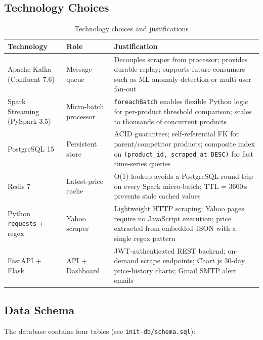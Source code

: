 \documentclass[11pt,a4paper]{article}
\begin{document}
\subsection{Technology Choices}

\begin{table}[H]
\centering\small\renewcommand{\arraystretch}{1.25}
\begin{tabularx}{\textwidth}{L{2.8cm} L{2.8cm} X}
\toprule
\textbf{Technology} & \textbf{Role} & \textbf{Justification} \\
\midrule
Apache Kafka (Confluent 7.6) & Message queue
  & Decouples scraper from processor; provides durable replay; supports
    future consumers such as ML anomaly detection or multi-user fan-out \\
Spark Streaming (PySpark 3.5) & Micro-batch processor
  & \texttt{foreachBatch} enables flexible Python logic for per-product
    threshold comparison; scales to thousands of concurrent products \\
PostgreSQL 15 & Persistent store
  & ACID guarantees; self-referential FK for parent/competitor products;
    composite index on \texttt{(product\_id, scraped\_at DESC)} for fast
    time-series queries \\
Redis 7 & Latest-price cache
  & O(1) lookup avoids a PostgreSQL round-trip on every Spark micro-batch;
    TTL = 3600\,s prevents stale cached values \\
Python \texttt{requests} + regex & Yahoo scraper
  & Lightweight HTTP scraping; Yahoo pages require no JavaScript execution;
    price extracted from embedded JSON with a single regex pattern \\
FastAPI + Flask & API + Dashboard
  & JWT-authenticated REST backend; on-demand scrape endpoints; Chart.js
    30-day price-history charts; Gmail SMTP alert emails \\
\bottomrule
\end{tabularx}
\caption{Technology choices and justifications}
\end{table}

\subsection{Data Schema}

The database contains four tables (see \texttt{init-db/schema.sql}):
\end{document}
